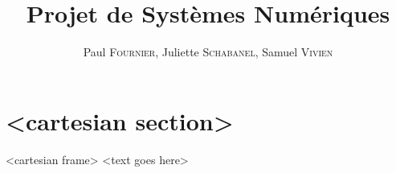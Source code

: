 \documentclass[intlimits, 10pt]{beamer}
\title[\textsc{Ernest'O'Clock}]{Projet de Systèmes Numériques}
\date{}
\author[\textsc{Fournier}, \textsc{Schabanel}, \textsc{Vivien}]{Paul \textsc{Fournier}, Juliette \textsc{Schabanel}, Samuel \textsc{Vivien}}
\begin{document}
	
	\maketitle	
	
	\begin{frame}
		\tableofcontents
	\end{frame}
	
	\section{<cartesian section>}
	
	\begin{frame}{<cartesian frame>}
		<text goes here>
	\end{frame}
\end{document}
